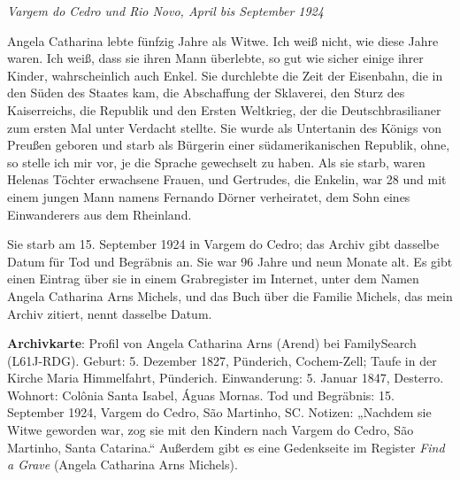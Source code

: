 \documentclass[
  ngerman,
  11pt,
  openany]{book}
\begin{document}
\emph{Vargem do Cedro und Rio Novo, April bis September 1924}

Angela Catharina lebte fünfzig Jahre als Witwe. Ich weiß nicht, wie
diese Jahre waren. Ich weiß, dass sie ihren Mann überlebte, so gut wie
sicher einige ihrer Kinder, wahrscheinlich auch Enkel. Sie durchlebte
die Zeit der Eisenbahn, die in den Süden des Staates kam, die
Abschaffung der Sklaverei, den Sturz des Kaiserreichs, die Republik und
den Ersten Weltkrieg, der die Deutschbrasilianer zum ersten Mal unter
Verdacht stellte. Sie wurde als Untertanin des Königs von Preußen
geboren und starb als Bürgerin einer südamerikanischen Republik, ohne,
so stelle ich mir vor, je die Sprache gewechselt zu haben. Als sie
starb, waren Helenas Töchter erwachsene Frauen, und Gertrudes, die
Enkelin, war 28 und mit einem jungen Mann namens Fernando Dörner
verheiratet, dem Sohn eines Einwanderers aus dem Rheinland.

Sie starb am 15. September 1924 in Vargem do Cedro; das Archiv gibt
dasselbe Datum für Tod und Begräbnis an. Sie war 96 Jahre und neun
Monate alt. Es gibt einen Eintrag über sie in einem Grabregister im
Internet, unter dem Namen Angela Catharina Arns Michels, und das Buch
über die Familie Michels, das mein Archiv zitiert, nennt dasselbe Datum.

\begin{ficha}

\textbf{Archivkarte}: Profil von Angela Catharina Arns (Arend) bei
FamilySearch (L61J-RDG). Geburt: 5. Dezember 1827, Pünderich,
Cochem-Zell; Taufe in der Kirche Maria Himmelfahrt, Pünderich.
Einwanderung: 5. Januar 1847, Desterro. Wohnort: Colônia Santa Isabel,
Águas Mornas. Tod und Begräbnis: 15. September 1924, Vargem do Cedro,
São Martinho, SC. Notizen: „Nachdem sie Witwe geworden war, zog sie mit
den Kindern nach Vargem do Cedro, São Martinho, Santa Catarina.``
Außerdem gibt es eine Gedenkseite im Register \emph{Find a Grave}
(Angela Catharina Arns Michels).

\end{ficha}
\end{document}
